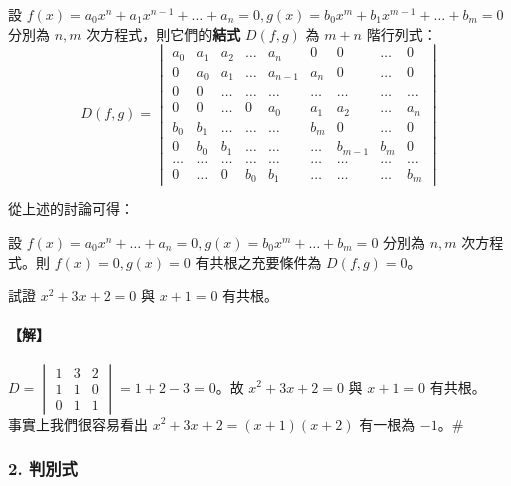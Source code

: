 \begin{definition}\label{def:b6-app3-resultant}
設 $f(x) = a_0 x^n + a_1 x^{n-1} + \dots + a_n = 0, g(x) = b_0 x^m + b_1 x^{m-1} + \dots + b_m = 0$ 分別為 $n, m$ 次方程式，則它們的\textbf{結式} $D(f, g)$ 為 $m+n$ 階行列式：
\[ D(f, g) = \begin{vmatrix}
a_0 & a_1 & a_2 & \dots & a_n & 0 & 0 & \dots & 0 \\
0 & a_0 & a_1 & \dots & a_{n-1} & a_n & 0 & \dots & 0 \\
0 & 0 & \dots & \dots & \dots & \dots & \dots & \dots & \dots \\
0 & 0 & \dots & 0 & a_0 & a_1 & a_2 & \dots & a_n \\
b_0 & b_1 & \dots & \dots & \dots & b_m & 0 & \dots & 0 \\
0 & b_0 & b_1 & \dots & \dots & \dots & b_{m-1} & b_m & 0 \\
\dots & \dots & \dots & \dots & \dots & \dots & \dots & \dots & \dots \\
0 & \dots & 0 & b_0 & b_1 & \dots & \dots & \dots & b_m
\end{vmatrix} \]
\end{definition}

從上述的討論可得：

\begin{theorem}\label{thm:b6-app3-resultant-roots}
設 $f(x) = a_0 x^n + \dots + a_n = 0, g(x) = b_0 x^m + \dots + b_m = 0$ 分別為 $n, m$ 次方程式。則 $f(x)=0, g(x)=0$ 有共根之充要條件為 $D(f, g) = 0$。
\end{theorem}

\begin{example}\label{ex:b6-app3-1}
試證 $x^2+3x+2=0$ 與 $x+1=0$ 有共根。
\end{example}

\paragraph{【解】}
$D = \begin{vmatrix} 1 & 3 & 2 \\ 1 & 1 & 0 \\ 0 & 1 & 1 \end{vmatrix} = 1 + 2 - 3 = 0$。故 $x^2+3x+2=0$ 與 $x+1=0$ 有共根。\\
事實上我們很容易看出 $x^2+3x+2 = (x+1)(x+2)$ 有一根為 $-1$。\hfill$\#$

\subsubsection*{2. 判別式}\label{subsec:b6-app3-2}

